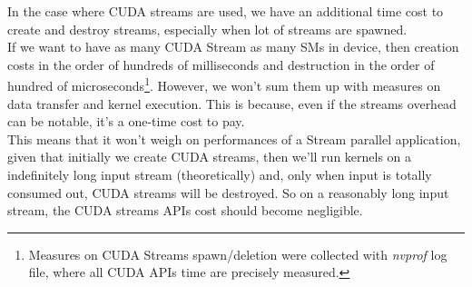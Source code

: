 In the case where CUDA streams are used, we have an additional time cost to create and destroy streams, especially when lot of streams are spawned.\\
If we want to have as many CUDA Stream as many SMs in device, then creation costs in the order of hundreds of milliseconds and destruction in the order of hundred of microseconds\footnote{Measures on CUDA Streams spawn/deletion were collected with \textit{nvprof} log file, where all CUDA APIs time are precisely measured.}. However, we won't sum them up with measures on data transfer and kernel execution. This is because, even if the streams overhead can be notable, it's a one-time cost to pay.\\
This means that it won't weigh on performances of a Stream parallel application, given that initially we create CUDA streams, then we'll run kernels on a indefinitely long input stream (theoretically) and, only when input is totally consumed out, CUDA streams will be destroyed. 
So on a reasonably long input stream, the CUDA streams APIs cost should become negligible.\\

